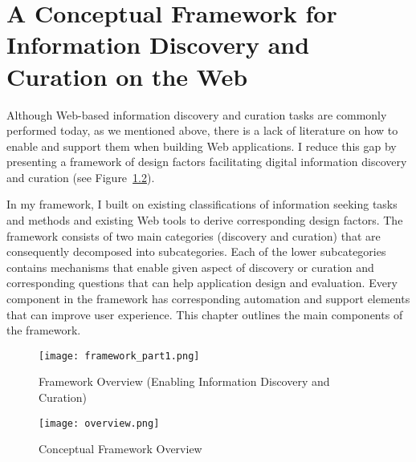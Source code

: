 \chapter{A Conceptual Framework for Information Discovery and Curation on the Web}
\label{chapter:framework}

Although Web-based information discovery and curation tasks are commonly performed today, as we mentioned above, there is a lack of literature on how to enable and support them when building Web applications. I reduce this gap by presenting a framework of design factors facilitating digital information discovery and curation (see Figure~\ref{fig:overview}). 

In my framework, I built on existing classifications of information seeking tasks and methods and existing Web tools to derive corresponding design factors. The framework consists of two main categories (discovery and curation) that are consequently decomposed into subcategories. Each of the lower subcategories contains mechanisms that enable given aspect of discovery or curation and corresponding questions that can help application design and evaluation. Every component in the framework has corresponding automation and support elements that can improve user experience. This chapter outlines the main components of the framework. 

\begin{figure}[ht!]
	\noindent
	\centering
	\texttt{[image: framework\_part1.png]}
	\caption{Framework Overview (Enabling Information Discovery and Curation)}
	\label{fig:framework_part1} 
\end{figure}

\begin{figure}[ht!]
	\noindent
	\centering
	\texttt{[image: overview.png]}
	\caption{Conceptual Framework Overview}
	\label{fig:overview} 
\end{figure}




